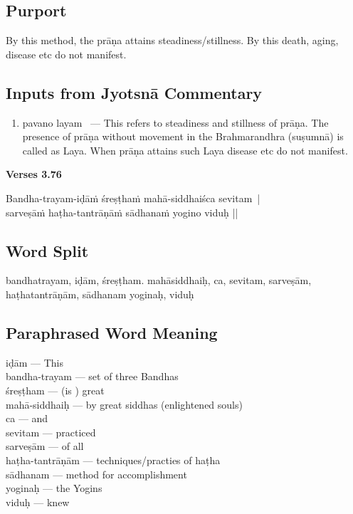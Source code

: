 \subsection*{Purport}

By this method, the prāṇa attains steadiness/stillness. By this death, aging, disease etc do not manifest. 

\subsection*{Inputs from Jyotsnā Commentary}

\begin{enumerate}
\item pavano layam  --- This refers to steadiness and stillness of prāṇa. The presence of prāṇa without movement in the Brahmarandhra (suṣumnā) is called as Laya. When prāṇa  attains such Laya disease etc do not manifest.  
\end{enumerate}
\newpage


\noindent \textbf{Verses 3.76}

\begin{shloka}
Bandha-trayam-iḍāṁ śreṣṭhaṁ mahā-siddhaiśca sevitam |\\
sarveṣāṁ haṭha-tantrāṇāṁ sādhanaṁ yogino viduḥ ||
\end{shloka}

\subsection*{Word Split}

bandhatrayam, iḍām, śreṣṭham. mahāsiddhaiḥ, ca, sevitam, sarveṣām, haṭhatantrāṇām, sādhanam yoginaḥ, viduḥ

\subsection*{Paraphrased Word Meaning}

\begin{multicols}{2}
iḍām --- This \\
bandha-trayam ---  set of three Bandhas \\
śreṣṭham ---  (is ) great \\
mahā-siddhaiḥ --- by great siddhas (enlightened souls)\\
ca --- and \\
sevitam ---  practiced \\
sarveṣām --- of all \\
haṭha-tantrāṇām ---  techniques/practies of haṭha\\
sādhanam --- method for accomplishment \\
yoginaḥ --- the Yogins \\
viduḥ --- knew  
\end{multicols}

